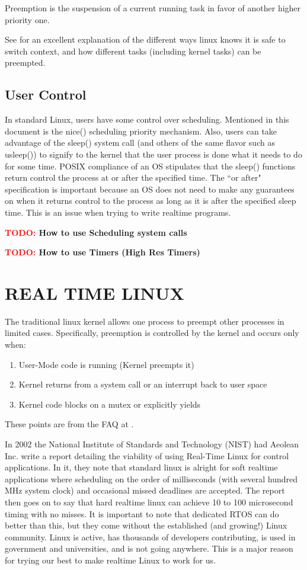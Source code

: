 \documentclass{article}
\newcommand{\TODO}[1]{ {\bf \textcolor{red}{TODO:} #1 }}
\begin{document}
Preemption is the suspension of a current running task in favor of another higher priority one.

See \cite{LinuxProcessSwitch} for an excellent explanation of the different ways linux knows it is safe to switch context, and how different tasks (including kernel tasks) can be preempted.

\subsection{User Control}
In standard Linux, users have some control over scheduling.  Mentioned in this document is the nice() scheduling priority mechanism.  Also, users can take advantage of the sleep() system call (and others of the same flavor such as usleep()) to signify to the kernel that the user process is done what it needs to do for some time.  POSIX compliance of an OS stipulates that the sleep() functions return control the process at or after the specified time.  The ``or after" specification is important because an OS does not need to make any guarantees on when it returns control to the process as long as it is after the specified sleep time.  This is an issue when trying to write realtime programs.

\TODO{How to use Scheduling system calls}

\TODO{How to use Timers (High Res Timers)}

\section{REAL TIME LINUX}
The traditional linux kernel allows one process to preempt other processes in limited cases.  Specifically, preemption is controlled by the kernel and occurs only when:

\begin{enumerate}
\item User-Mode code is running (Kernel preempts it)
\item Kernel returns from a system call or an interrupt back to user space
\item Kernel code blocks on a mutex or explicitly yields
\end{enumerate}
These points are from the FAQ at \cite{RealTimeLinux}.

In 2002 the National Institute of Standards and Technology (NIST) had Aeolean Inc. write a report detailing the viability of using Real-Time Linux for control applications. \cite{IntroLinuxForRealTime}  In it, they note that standard linux is alright for soft realtime applications where scheduling on the order of milliseconds (with several hundred MHz system clock) and occasional missed deadlines are accepted.  The report then goes on to say that hard realtime linux can achieve 10 to 100 microsecond timing with no misses.  It is important to note that dedicated RTOS can do better than this, but they come without the established (and growing!) Linux community.  Linux is active, has thousands of developers contributing, is used in government and universities, and is not going anywhere.  This is a major reason for trying our best to make realtime Linux to work for us.
\end{document}
